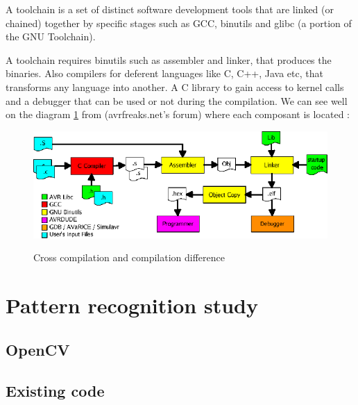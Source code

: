 \documentclass[english,a4paper,11pt]{report}
\begin{document}
	\par A toolchain is a set of distinct software development tools that are linked (or chained) together by specific stages such as GCC, binutils and glibc (a portion of the GNU Toolchain)\cite{Toolchain}.
	\par A toolchain requires binutils such as assembler and linker, that produces the binaries. Also compilers for deferent languages like C, C++, Java etc, that transforms any language into another. A C library to gain access to kernel calls and a debugger that can be used or not during the compilation. We can see well on the diagram \ref{compchain} from (avrfreaks.net's forum)  where each composant is located :
	\begin{figure}[ht]
		\begin{center}
			\includegraphics[scale=0.5]{images_not_compressed/compchain.png}
			\label{compchain}
			\caption{Cross compilation and compilation difference}
		\end{center}
	\end{figure}

	
	\section{Pattern recognition study}
	\subsection{OpenCV}
	\subsection{Existing code}

	
	

	\clearpage

{}
	


	\listoffigures
	
	

	
	
\end{document}
